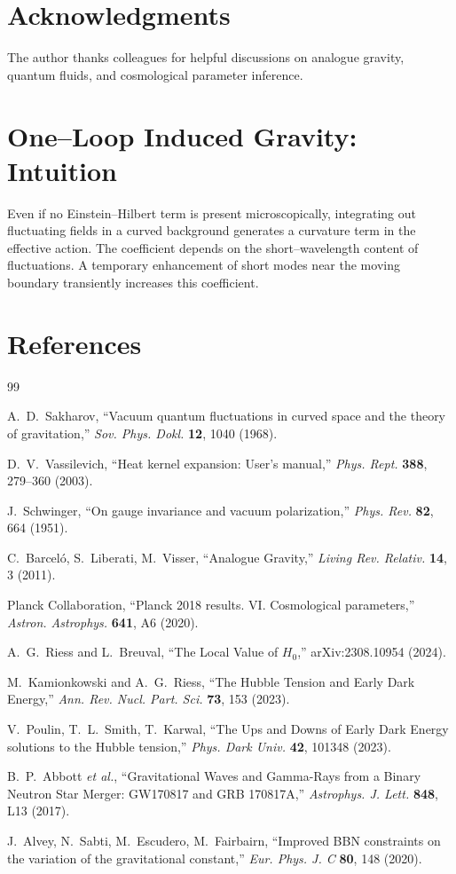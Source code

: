 \documentclass[11pt,a4paper]{article}
\begin{document}
\section*{Acknowledgments}
The author thanks colleagues for helpful discussions on analogue gravity, quantum fluids, and cosmological parameter inference.

\appendix
\section{One--Loop Induced Gravity: Intuition}
Even if no Einstein--Hilbert term is present microscopically, integrating out fluctuating fields in a curved background generates a curvature term in the effective action. The coefficient depends on the short--wavelength content of fluctuations. A temporary enhancement of short modes near the moving boundary transiently increases this coefficient.

\section*{References}
\begin{thebibliography}{99}

A.~D.~Sakharov, ``Vacuum quantum fluctuations in curved space and the theory of gravitation,'' \emph{Sov. Phys. Dokl.} \textbf{12}, 1040 (1968).

D.~V.~Vassilevich, ``Heat kernel expansion: User's manual,'' \emph{Phys. Rept.} \textbf{388}, 279--360 (2003).

J.~Schwinger, ``On gauge invariance and vacuum polarization,'' \emph{Phys. Rev.} \textbf{82}, 664 (1951).

C.~Barcel\'o, S.~Liberati, M.~Visser, ``Analogue Gravity,'' \emph{Living Rev. Relativ.} \textbf{14}, 3 (2011).

Planck Collaboration, ``Planck 2018 results. VI. Cosmological parameters,'' \emph{Astron. Astrophys.} \textbf{641}, A6 (2020).

A.~G.~Riess and L.~Breuval, ``The Local Value of $H_0$,'' arXiv:2308.10954 (2024).

M.~Kamionkowski and A.~G.~Riess, ``The Hubble Tension and Early Dark Energy,'' \emph{Ann. Rev. Nucl. Part. Sci.} \textbf{73}, 153 (2023).

V.~Poulin, T.~L.~Smith, T.~Karwal, ``The Ups and Downs of Early Dark Energy solutions to the Hubble tension,'' \emph{Phys. Dark Univ.} \textbf{42}, 101348 (2023).

B.~P.~Abbott \emph{et al.}, ``Gravitational Waves and Gamma-Rays from a Binary Neutron Star Merger: GW170817 and GRB 170817A,'' \emph{Astrophys. J. Lett.} \textbf{848}, L13 (2017).

J.~Alvey, N.~Sabti, M.~Escudero, M.~Fairbairn, ``Improved BBN constraints on the variation of the gravitational constant,'' \emph{Eur. Phys. J. C} \textbf{80}, 148 (2020).

\end{thebibliography}
\end{document}

